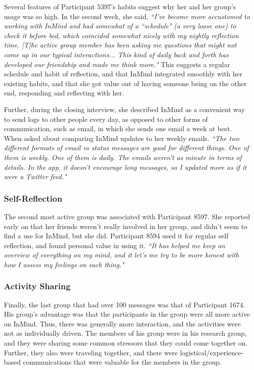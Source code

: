     Several features of Participant 5397's habits suggest why her and her group's
    usage was so high.
    In the second week, she said, 
    \textit{``I've become more accustomed to working with InMind and had somewhat
    of a ``schedule" (a very loose one) to check it before bed,
    which coincided somewhat nicely with my nightly reflection time.
    [T]he active group member has been asking me questions that might not come up
    in our typical interactions...
    This kind of daily back and forth has developed our friendship
    and made me think more."}
    This suggests a regular schedule and habit of reflection,
    and that InMind integrated smoothly with her existing habits,
    and that she got value out of having someone being on the other end,
    responding and reflecting with her.

    Further, during the closing interview, she described InMind as a convenient
    way to send logs to other people every day,
    as opposed to other forms of communication, such as email, in which she sends
    one email a week at best.
    When asked about comparing InMind updates to her weekly emails.
    \textit{
    ``The two different formats of email vs status messages are good for different
    things.
    One of them is weekly. One of them is daily.
    The emails weren't as minute in terms of details.
    In the app, it doesn't encourage long messages,
    so I updated more as if it were a Twitter feed."
    }

    \subsubsection{Self-Reflection}
    The second most active group was associated with Participant 8597.
    She reported early on that her friends weren't really involved in her group,
    and didn't seem to find a use for InMind, but she did.
    Participant 8594 used it for regular self reflection,
    and found personal value in using it.
    \textit{``It has helped me keep an overview of everything on my mind,
    and it let's me try to be more honest with how I assess my feelings
    on each thing."}
    
    \subsubsection{Activity Sharing}
    Finally, the last group that had over 100 messages was that of
    Participant 1674.
    His group's advantage was that the participants in the group were all
    more active on InMind.
    Thus, there was generally more interaction,
    and the activities were not as individually driven.
    The members of his group were in his research group,
    and they were sharing some common stressors that they could come together on.
    Further, they also were traveling together,
    and there were logistical/experience-based communications that were
    valuable for the members in the group.

